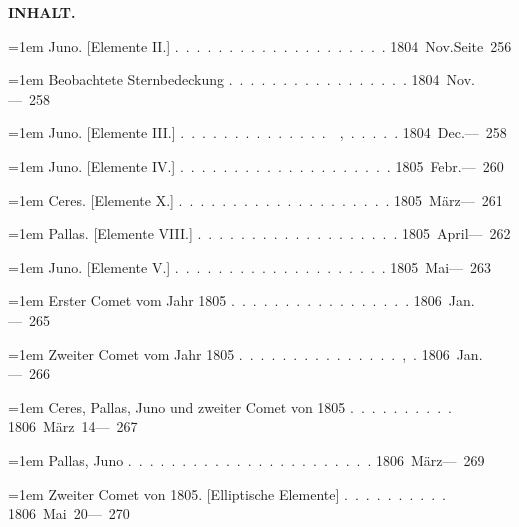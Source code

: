 \clearpage
{}
\noindent\makebox[10mm][l]{}%
\parbox[b]{\dimexpr\textwidth-20mm\relax}{\centering\small\textbf{INHALT.}}%
\par\nobreak\medskip
\begingroup
\raggedright
\noindent\hangindent=1em Juno. [Elemente II.] \mbox{.\ .\ .\ .\ .\ .\ .\ .\ .\ .\ .\ .\ .\ .\ .\ .\ .\ .\ .\ .} \hfill\mbox{1804 Nov.}\quad\mbox{Seite 256}\par\smallskip
\noindent\hangindent=1em Beobachtete Sternbedeckung \mbox{.\ .\ .\ .\ .\ .\ .\ .\ .\ .\ .\ .\ .\ .\ .\ .\ .} \hfill\mbox{1804 Nov.}\quad\mbox{--- 258}\par\smallskip
\noindent\hangindent=1em Juno. [Elemente III.] \mbox{.\ .\ .\ .\ .\ .\ .\ .\ .\ .\ .\ .\ .\ .\ \ ,\ .\ .\ .\ .\ .} \hfill\mbox{1804 Dec.}\quad\mbox{--- 258}\par\smallskip
\noindent\hangindent=1em Juno. [Elemente IV.] \mbox{.\ .\ .\ .\ .\ .\ .\ .\ .\ .\ .\ .\ .\ .\ .\ .\ .\ .\ .\ .} \hfill\mbox{1805 Febr.}\quad\mbox{--- 260}\par\smallskip
\noindent\hangindent=1em Ceres. [Elemente X.] \mbox{.\ .\ .\ .\ .\ .\ .\ .\ .\ .\ .\ .\ .\ .\ .\ .\ .\ .\ .\ .} \hfill\mbox{1805 März}\quad\mbox{--- 261}\par\smallskip
\noindent\hangindent=1em Pallas. [Elemente VIII.] \mbox{.\ .\ .\ .\ .\ .\ .\ .\ .\ .\ .\ .\ .\ .\ .\ .\ .\ .\ .} \hfill\mbox{1805 April}\quad\mbox{--- 262}\par\smallskip
\noindent\hangindent=1em Juno. [Elemente V.] \mbox{.\ .\ .\ .\ .\ .\ .\ .\ .\ .\ .\ .\ .\ .\ .\ .\ .\ .\ .\ .} \hfill\mbox{1805 Mai}\quad\mbox{--- 263}\par\smallskip
\noindent\hangindent=1em Erster Comet vom Jahr 1805 \mbox{.\ .\ .\ .\ .\ .\ .\ .\ .\ .\ .\ .\ .\ .\ .\ .\ .} \hfill\mbox{1806 Jan.}\quad\mbox{---\textperiodcentered{} 265}\par\smallskip
\noindent\hangindent=1em Zweiter Comet vom Jahr 1805 \mbox{.\ .\ .\ .\ .\ .\ .\ .\ .\ .\ .\ .\ .\ .\ .\ ,\ .} \hfill\mbox{1806 Jan.}\quad\mbox{--- 266}\par\smallskip
\noindent\hangindent=1em Ceres, Pallas, Juno und zweiter Comet von 1805 \mbox{.\ .\ .\ .\ .\ .\ .\ .\ .\ .} \hfill\mbox{1806 März 14}\quad\mbox{--- 267}\par\smallskip
\noindent\hangindent=1em Pallas, Juno \mbox{.\ .\ .\ .\ .\ .\ .\ .\ .\ .\ .\ .\ .\ .\ .\ .\ .\ .\ .\ .\ .\ .\ .} \hfill\mbox{1806 März}\quad\mbox{--- 269}\par\smallskip
\noindent\hangindent=1em Zweiter Comet von 1805. [Elliptische Elemente] \mbox{.\ .\ .\ .\ .\ .\ .\ .\ .\ .} \hfill\mbox{1806 Mai 20}\quad\mbox{--- 270}\par\smallskip
